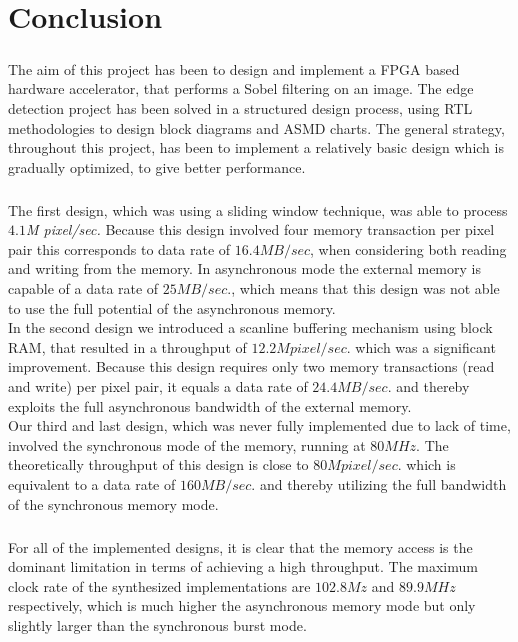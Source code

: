\chapter{Conclusion}
\paragraph*{ }
The aim of this project has been to design and implement a FPGA based hardware accelerator, that performs a Sobel filtering on an image.
The edge detection project has been solved in a structured design process, using RTL methodologies to design block diagrams and  ASMD charts. The general strategy, throughout this project, has been to implement a relatively basic design which is gradually  optimized, to give better performance.
\paragraph*{ }
The first design, which was using a sliding window technique, was able to process $4.1$\textit{M pixel/sec.} Because this design involved four memory transaction per pixel pair this corresponds to data rate of $16.4MB/sec$, when considering both reading and writing from the memory. In asynchronous mode the external memory is capable of a data rate of $25MB/sec.$, which means that this design was not able to use the full potential of the asynchronous memory.\\
In the second design we introduced a scanline buffering mechanism using block RAM, that resulted in a throughput of $12.2M pixel/sec.$ which was a significant improvement. Because this design requires only two memory transactions (read and write) per pixel pair, it equals a data rate of $24.4MB/sec.$ and thereby exploits the full asynchronous bandwidth of the external memory. \\
Our third and last design, which was never fully implemented due to lack of time, involved the synchronous mode of the memory, running at $80MHz$. The theoretically throughput of this design is close to $80M pixel/sec.$ which is equivalent to a data rate of $160MB/sec.$ and thereby utilizing the full bandwidth of the synchronous memory mode.
\paragraph*{ }
For all of the implemented designs, it is clear that the memory access is the dominant limitation in terms of achieving a high throughput. The maximum clock rate of the synthesized implementations are $102.8Mz$ and $89.9MHz$ respectively, which is much higher the asynchronous memory mode but only slightly larger than the synchronous burst mode.



\newpage